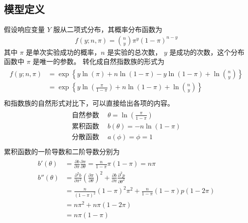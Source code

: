 \documentclass[letterpaper,10pt,english]{sphinxmanual}
\begin{document}
\subsection{模型定义}
\label{\detokenize{_u4e8c_u9879_u6a21_u578b/content:id8}}
假设响应变量 \(Y\) 服从二项式分布，其概率分布函数为
\begin{equation}\label{equation:二项模型/content:二项模型/content:24}
\begin{split}f(y;n,\pi) =\binom{n}{y} \pi^y(1-\pi)^{n-y}\end{split}
\end{equation}
其中 \(\pi\) 是单次实验成功的概率，\(n\) 是实验的总次数，
\(y\) 是成功的次数，这个分布函数中 \(\pi\) 是唯一的参数。
转化成自然指数族的形式为
\begin{align}\label{equation:二项模型/content:二项模型/content:25}\!\begin{aligned}
f(y;n,\pi) &= \exp \left \{ y\ln(\pi) +n\ln(1-\pi) -y\ln(1-\pi) +\ln \binom{n}{y}   \right \}\\
&= \exp \left \{  y \ln \left ( \frac{\pi}{1-\pi} \right )  + n\ln(1-\pi) +\ln \binom{n}{y} \right \}\\
\end{aligned}\end{align}
和指数族的自然形式对比下，可以直接给出各项的内容。
\begin{align}\label{equation:二项模型/content:二项模型/content:26}\!\begin{aligned}
\text{自然参数}\ &\ \theta = \ln \left ( \frac{\pi}{1-\pi} \right )\\
\text{累积函数}\ &\ b(\theta) = - n\ln(1-\pi)\\
\text{分散函数}\ &\ a(\phi) = \phi = 1\\
\end{aligned}\end{align}
累积函数的一阶导数和二阶导数分别为
\begin{align}\label{equation:二项模型/content:二项模型/content:27}\!\begin{aligned}
b'(\theta) &= \frac{\partial b}{\partial \pi}\frac{\partial \pi}{\partial \theta}
=\frac{n}{1-\pi}\pi(1-\pi)= n \pi\\
b''(\theta)
&= \frac{\partial^2 b}{\partial \pi^2}  \left( \frac{\partial \pi }{\partial \theta} \right)^2
+ \frac{\partial b}{\partial \pi}\frac{\partial^2 p}{\partial \theta^2}\\
&= \frac{n}{(1-\pi)^2}(1-\pi)^2 \pi^2 + \frac{n}{1-\pi}(1-\pi)p(1-2\pi)\\
&= n\pi^2 + n\pi(1-2\pi)\\
&= n\pi(1-\pi)\\
\end{aligned}\end{align}
\end{document}
